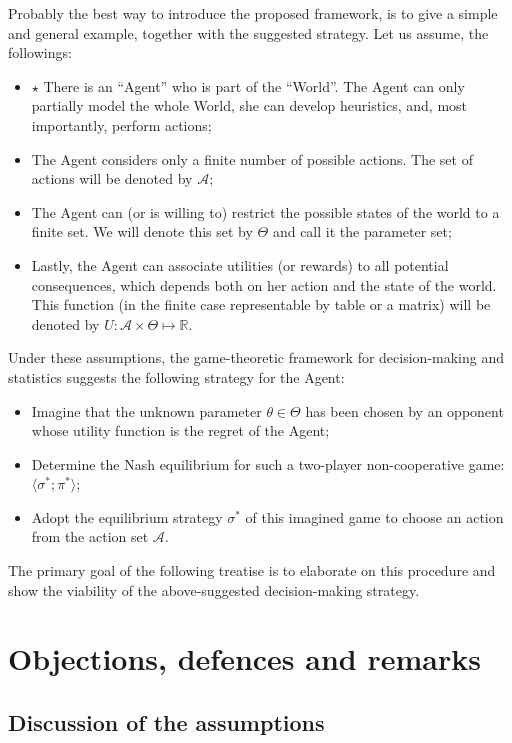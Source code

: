 \documentclass{article}
\begin{document}
Probably the best way to introduce the proposed framework, is to give a simple and general example, together with the suggested strategy. Let us assume, the followings:

\begin{itemize}
    \item $\star$ There is an ``Agent'' who is part of the ``World''. The Agent can only partially model the whole World, she can develop heuristics, and, most importantly, perform actions;
    \item The Agent considers only a finite number of possible actions. The set of actions will be denoted by $\mathcal{A}$;
    \item The Agent can (or is willing to) restrict the possible states of the world to a finite set. We will denote this set by $\Theta$ and call it the parameter set;
    \item Lastly, the Agent can associate utilities (or rewards) to all potential consequences, which depends both on her action and the state of the world. This function (in the finite case representable by table or a matrix) will be denoted by $U: \mathcal{A} \times \Theta \mapsto \mathbb{R}$.
\end{itemize}

Under these assumptions, the game-theoretic framework for decision-making and statistics suggests the following strategy for the Agent:

\begin{itemize}
    \item Imagine that the unknown parameter $\theta \in \Theta$ has been chosen by an opponent whose utility function is the regret of the Agent;
    \item Determine the Nash equilibrium for such a two-player non-cooperative game: $\langle \sigma^*; \pi^* \rangle$;
    \item Adopt the equilibrium strategy $\sigma^*$ of this imagined game to choose an action from the action set $\mathcal{A}$.
\end{itemize}

The primary goal of the following treatise is to elaborate on this procedure and show the viability of the above-suggested decision-making strategy.


\section*{Objections, defences and remarks}

\subsection*{Discussion of the assumptions}
\end{document}
